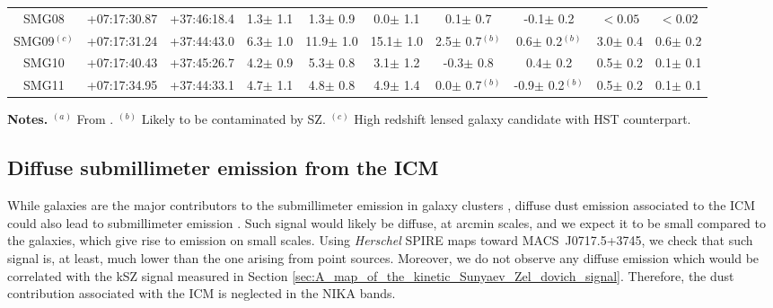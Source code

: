 \documentclass[twocolumn,traditabstract]{aa}
\begin{document}
\begin{table}[h]
\begin{center}
\begin{tabular}{c|cc|ccc|cc|cc}
SMG08 & +07:17:30.87 & +37:46:18.4 &      1.3$\pm$     1.1 &      1.3$\pm$     0.9 &      0.0$\pm$     1.1 &      0.1$\pm$     0.7 &     -0.1$\pm$     0.2 &      $<0.05$ &     $<0.02$ \\ 
SMG09$^{(c)}$ & +07:17:31.24 & +37:44:43.0 &      6.3$\pm$     1.0 &     11.9$\pm$     1.0 &     15.1$\pm$     1.0 &      2.5$\pm$     0.7$^{(b)}$ &      0.6$\pm$     0.2$^{(b)}$ &      3.0$\pm$     0.4 &      0.6$\pm$     0.2 \\ 
SMG10 & +07:17:40.43 & +37:45:26.7 &      4.2$\pm$     0.9 &      5.3$\pm$     0.8 &      3.1$\pm$     1.2 &     -0.3$\pm$     0.8 &      0.4$\pm$     0.2 &      0.5$\pm$     0.2 &      0.1$\pm$     0.1 \\ 
SMG11 & +07:17:34.95 & +37:44:33.1 &      4.7$\pm$     1.1 &      4.8$\pm$     0.8 &      4.9$\pm$     1.4 &      0.0$\pm$     0.7$^{(b)}$ &     -0.9$\pm$     0.2$^{(b)}$ &      0.5$\pm$     0.2 &      0.1$\pm$     0.1 \\ 
\hline
\end{tabular}
\end{center}
{\small {\bf Notes.} $^{(a)}$ From \cite{Sayers2013}. $^{(b)}$ Likely to be contaminated by SZ. $^{(c)}$ High redshift lensed galaxy candidate with HST counterpart.}
\label{tab:submm_sources}
\end{table}

\subsection{Diffuse submillimeter emission from the ICM}\label{sec:Diffuse_sub-millimeter_emission_from_the_ICM}
While galaxies are the major contributors to the submillimeter emission in galaxy clusters \citep{Coppin2011}, diffuse dust emission associated to the ICM could also lead to submillimeter emission \citep[see, for example,][who study the overall contribution of dust in clusters]{Montier2005,Planck2016XLIII}. Such signal would likely be diffuse, at arcmin scales, and we expect it to be small compared to the galaxies, which give rise to emission on small scales. Using \textit{Herschel} SPIRE maps toward \mbox{MACS~J0717.5+3745}, we check that such signal is, at least, much lower than the one arising from point sources. Moreover, we do not observe any diffuse emission which would be correlated with the kSZ signal measured in Section \ref{sec:A_map_of_the_kinetic_Sunyaev_Zel_dovich_signal}. Therefore, the dust contribution associated with the ICM is neglected in the NIKA bands.
\end{document}
